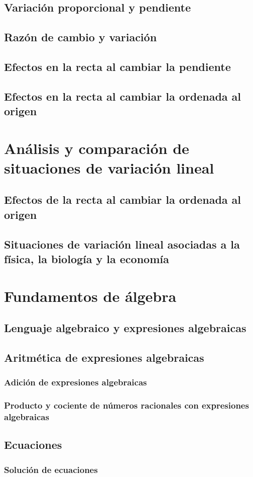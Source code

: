 \documentclass[12pt]{book}
\begin{document}
\begin{mainmatter}
    \subsection{Variación proporcional y pendiente}
    \subsection{Razón de cambio y variación}
    \subsection{Efectos en la recta al cambiar la pendiente}
    \subsection{Efectos en la recta al cambiar la ordenada al origen}

    \section{Análisis y comparación de situaciones de variación lineal}
    \subsection{Efectos de la recta al cambiar la ordenada al origen}
    \subsection{Situaciones de variación lineal asociadas a la física, la biología y la economía}


    \section{Fundamentos de álgebra}
    \subsection{Lenguaje algebraico y expresiones algebraicas}
    \subsection{Aritmética de expresiones algebraicas}
    \subsubsection{Adición de expresiones algebraicas}
    \subsubsection{Producto y cociente de números racionales con expresiones algebraicas}
    \subsection{Ecuaciones}
    \subsubsection{Solución de ecuaciones}





\end{mainmatter}
\end{document}
